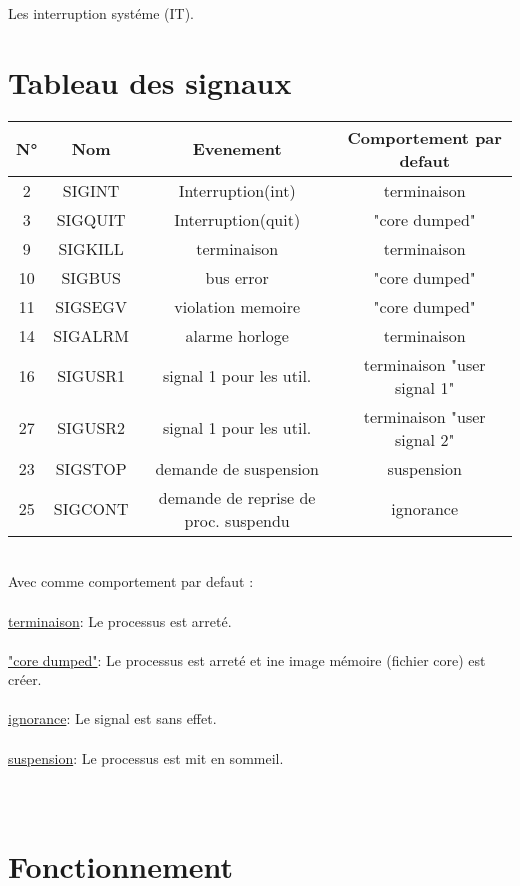 \documentclass[a4paper,12pt,openany]{book}
\begin{document}
Les interruption systéme (IT).\\


\section{Tableau des signaux}

\begin{tabular}{|c|c|c|c|}
\hline
N° & Nom & Evenement & Comportement par defaut \\ \hline
2 & SIGINT & Interruption(int) & terminaison\\
3 & SIGQUIT & Interruption(quit) & "core dumped"\\
9 & SIGKILL & terminaison & terminaison\\
10 & SIGBUS  & bus error & "core dumped"\\
11 & SIGSEGV & violation memoire & "core dumped"\\
14 & SIGALRM  & alarme horloge & terminaison\\
16 & SIGUSR1 & signal 1 pour les util. & terminaison "user signal 1"\\
27 & SIGUSR2 & signal 1 pour les util. & terminaison "user signal 2"\\
23 & SIGSTOP & demande de suspension & suspension\\
25 & SIGCONT & demande de reprise de proc. suspendu & ignorance \\ \hline
\end{tabular}
\\
Avec comme comportement par defaut : \\
\\
\underline{terminaison}: Le processus est arreté.\\
\\
\underline{"core dumped"}: Le processus est arreté et ine image mémoire (fichier core) est créer.\\
\\
\underline{ignorance}: Le signal est sans effet.\\
\\
\underline{suspension}: Le processus est mit en sommeil.\\
\\
\\

\section{Fonctionnement}
\end{document}
